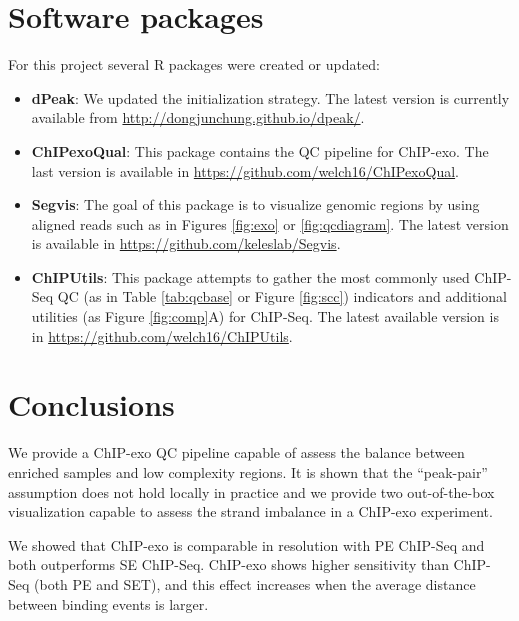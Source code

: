 \documentclass[11pt]{article}\usepackage[]{graphicx}\usepackage[]{color}
\begin{document}



\section{Software packages}
\label{sec:software}

For this project several R packages were created or updated:

\begin{itemize}
\item \textbf{dPeak}: We updated the initialization strategy. The
  latest version is currently available from
  \url{http://dongjunchung.github.io/dpeak/}.
\item \textbf{ChIPexoQual}: This package contains the QC pipeline for
  ChIP-exo. The last version is available in
  \url{https://github.com/welch16/ChIPexoQual}.
\item \textbf{Segvis}: The goal of this package is to visualize
  genomic regions by using aligned reads such as in Figures
  \ref{fig:exo} or \ref{fig:qcdiagram}.  The latest version is
  available in \url{https://github.com/keleslab/Segvis}.
\item \textbf{ChIPUtils}: This package attempts to gather the most
  commonly used ChIP-Seq QC (as in Table \ref{tab:qcbase} or Figure
  \ref{fig:scc}) indicators and additional utilities (as Figure
  \ref{fig:comp}A) for ChIP-Seq. The latest available version is in
  \url{https://github.com/welch16/ChIPUtils}.
\end{itemize}

\section{Conclusions}
\label{sec:conclusions}

We provide a ChIP-exo QC pipeline capable of assess the balance
between enriched samples and low complexity regions. It is shown that
the ``peak-pair'' assumption does not hold locally in practice and we
provide two out-of-the-box visualization capable to assess the strand
imbalance in a ChIP-exo experiment.

We showed that ChIP-exo is comparable in resolution with PE ChIP-Seq
and both outperforms SE ChIP-Seq. ChIP-exo shows higher sensitivity
than ChIP-Seq (both PE and SET), and this effect increases when the
average distance between binding events is larger.
\end{document}

